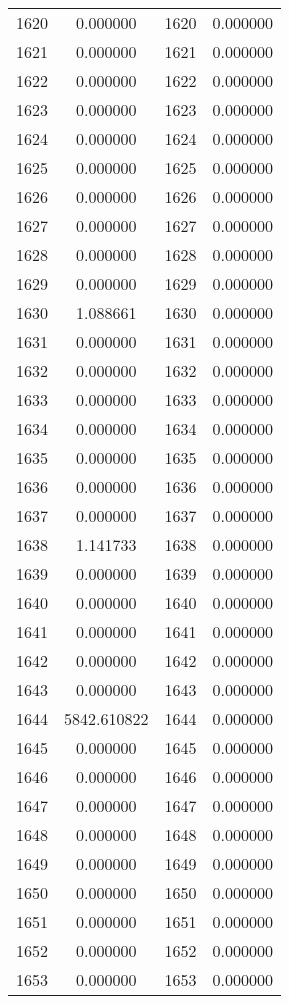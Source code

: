 \documentclass[12pt]{article}
\begin{document}
\begin{longtable}{@{}cccc@{}}
1620 & 0.000000 & 1620 & 0.000000 \\
1621 & 0.000000 & 1621 & 0.000000 \\
1622 & 0.000000 & 1622 & 0.000000 \\
1623 & 0.000000 & 1623 & 0.000000 \\
1624 & 0.000000 & 1624 & 0.000000 \\
1625 & 0.000000 & 1625 & 0.000000 \\
1626 & 0.000000 & 1626 & 0.000000 \\
1627 & 0.000000 & 1627 & 0.000000 \\
1628 & 0.000000 & 1628 & 0.000000 \\
1629 & 0.000000 & 1629 & 0.000000 \\
1630 & 1.088661 & 1630 & 0.000000 \\
1631 & 0.000000 & 1631 & 0.000000 \\
1632 & 0.000000 & 1632 & 0.000000 \\
1633 & 0.000000 & 1633 & 0.000000 \\
1634 & 0.000000 & 1634 & 0.000000 \\
1635 & 0.000000 & 1635 & 0.000000 \\
1636 & 0.000000 & 1636 & 0.000000 \\
1637 & 0.000000 & 1637 & 0.000000 \\
1638 & 1.141733 & 1638 & 0.000000 \\
1639 & 0.000000 & 1639 & 0.000000 \\
1640 & 0.000000 & 1640 & 0.000000 \\
1641 & 0.000000 & 1641 & 0.000000 \\
1642 & 0.000000 & 1642 & 0.000000 \\
1643 & 0.000000 & 1643 & 0.000000 \\
1644 & 5842.610822 & 1644 & 0.000000 \\
1645 & 0.000000 & 1645 & 0.000000 \\
1646 & 0.000000 & 1646 & 0.000000 \\
1647 & 0.000000 & 1647 & 0.000000 \\
1648 & 0.000000 & 1648 & 0.000000 \\
1649 & 0.000000 & 1649 & 0.000000 \\
1650 & 0.000000 & 1650 & 0.000000 \\
1651 & 0.000000 & 1651 & 0.000000 \\
1652 & 0.000000 & 1652 & 0.000000 \\
1653 & 0.000000 & 1653 & 0.000000 \\

\end{longtable}
\end{document}
